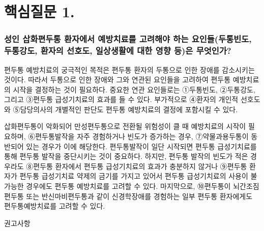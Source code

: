 \documentclass[]{book}
\begin{document}
\hypertarget{section-9}{%
\section{핵심질문 1.}\label{section-9}}

\hypertarget{section-10}{%
\subsubsection*{성인 삽화편두통 환자에서 예방치료를 고려해야 하는 요인들(두통빈도, 두통강도, 환자의 선호도, 일상생활에 대한 영향 등)은 무엇인가?}\label{section-10}}

편두통 예방치료의 궁극적인 목적은 편두통 환자의 두통으로 인한 장애를 감소시키는 것이다. 따라서 두통으로 인한 장애와 그와 연관된 요인들을 고려하여 편두통 예방치료의 시작을 결정하는 것이 필요하다. 중요한 연관 요인들로는 ①두통빈도, ②두통강도, 그리고 ③편두통 급성기치료의 효과를 들 수 있다. 부가적으로 ④환자의 개인적 선호도와 ⑤담당의사의 개별적인 판단도 편두통 예방치료의 결정에 포함시킬 수 있다.

삽화편두통이 악화되어 만성편두통으로 전환될 위험성이 클 때 예방치료의 시작이 필요하며, ⑥편두통발작을 자주 경험하거나 빈도가 증가하는 경우, ⑦약물과용두통이 동반되어 있는 경우가 이에 해당한다. 편두통발작이 일단 시작되면 편두통 급성기치료를 통해 편두통 발작을 중단시키는 것이 중요하다. 하지만, 편두통 발작의 빈도가 적은 경우라도 ⑧편두통 환자에서 편두통 급성기치료의 효과가 충분하지 않거나 ⑨편두통 환자가 편두통 급성기치료 약제의 금기를 가지고 있어서 편두통 급성기치료의 사용이 불가능한 경우에도 편두통 예방치료를 고려할 수 있다. 마지막으로, ⑩편두통이 뇌간조짐편두통 또는 반신마비편두통과 같이 신경학장애를 경험하는 일부 편두통 환자에게도 편두통예방치료를 고려할 수 있다.

권고사항
\end{document}
